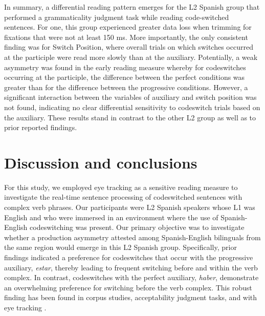 \documentclass[output=paper,colorlinks,citecolor=brown]{langscibook}
\begin{document}
In summary, a differential reading pattern emerges for the L2 Spanish group that performed a grammaticality judgment task while reading code-switched sentences. For one, this group experienced greater data loss when trimming for fixations that were not at least 150 ms. More importantly, the only consistent finding was for Switch Position, where overall trials on which switches occurred at the participle were read more slowly than at the auxiliary. Potentially, a weak asymmetry was found in the early reading measure whereby for codeswitches occurring at the participle, the difference between the perfect conditions was greater than for the difference between the progressive conditions. However, a significant interaction between the variables of auxiliary and switch position was not found, indicating no clear differential sensitivity to codeswitch trials based on the auxiliary. These results stand in contrast to the other L2 group as well as to prior reported findings.

\section{Discussion and conclusions}
For this study, we employed eye tracking as a sensitive reading measure to investigate the real-time sentence processing of codeswitched sentences with complex verb phrases. Our participants were L2 Spanish speakers whose L1 was English and who were immersed in an environment where the use of Spanish-English codeswitching was present. Our primary objective was to investigate whether a production asymmetry attested among Spanish-English bilinguals from the same region would emerge in this L2 Spanish group. Specifically, prior findings indicated a preference for codeswitches that occur with the progressive auxiliary, \textit{estar}, thereby leading to frequent switching before and within the verb complex. In contrast, codeswitches with the perfect auxiliary, \textit{haber}, demonstrate an overwhelming preference for switching before the verb complex. This robust finding has been found in corpus studies, acceptability judgment tasks, and with eye tracking \citep{GuzzardoTamargoetal2016}.
\end{document}
